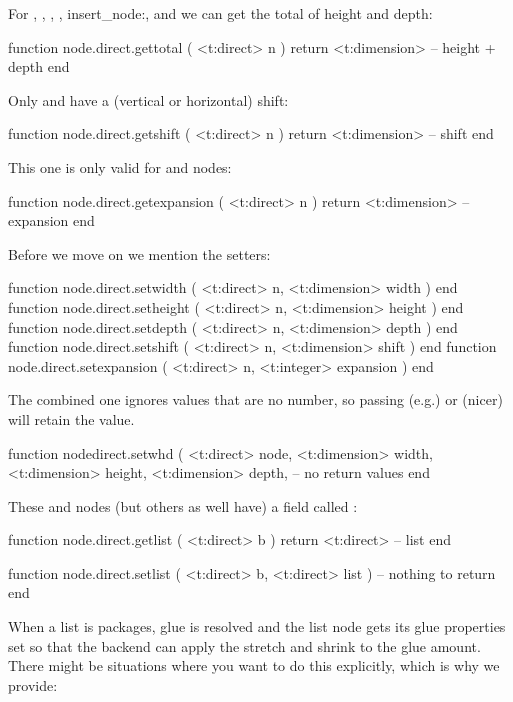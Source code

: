 For , , , , \type
{insert_node:},  and  we can get the total of height
and depth:

\starttyping[option=LUA]
function node.direct.gettotal ( <t:direct> n )
    return <t:dimension> -- height + depth
end
\stoptyping

Only  and  have a (vertical or horizontal) shift:

\starttyping[option=LUA]
function node.direct.getshift ( <t:direct> n )
    return <t:dimension> -- shift
end
\stoptyping

This one is only valid for  and  nodes:

\starttyping[option=LUA]
function node.direct.getexpansion ( <t:direct> n )
    return <t:dimension> -- expansion
end
\stoptyping

Before we move on we mention the setters:

\starttyping[option=LUA]
function node.direct.setwidth     ( <t:direct> n, <t:dimension> width     ) end
function node.direct.setheight    ( <t:direct> n, <t:dimension> height    ) end
function node.direct.setdepth     ( <t:direct> n, <t:dimension> depth     ) end
function node.direct.setshift     ( <t:direct> n, <t:dimension> shift     ) end
function node.direct.setexpansion ( <t:direct> n, <t:integer>   expansion ) end
\stoptyping

The combined one ignores values that are no number, so passing (e.g.) 
or (nicer)  will retain the value.

\starttyping[option=LUA]
function nodedirect.setwhd (
    <t:direct>    node,
    <t:dimension> width,
    <t:dimension> height,
    <t:dimension> depth,
    -- no return values
end
\stoptyping

These  and  nodes (but others as well have) a field
called :

\starttyping[option=LUA]
function node.direct.getlist ( <t:direct> b )
    return <t:direct> -- list
end

function node.direct.setlist ( <t:direct> b, <t:direct> list )
    -- nothing to return
end
\stoptyping

When a list is packages, glue is resolved and the list node gets its glue properties
set so that the backend can apply the stretch and shrink to the glue amount. There might
be situations where you want to do this explicitly, which is why we provide:

